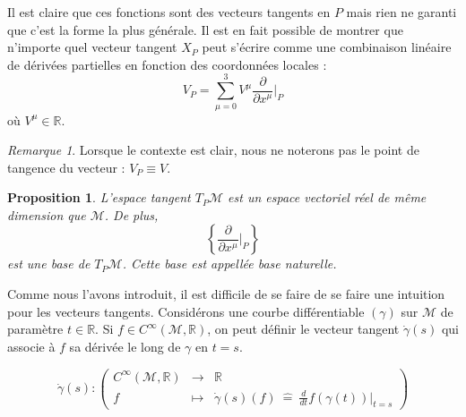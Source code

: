 \documentclass[a4paper,11pt]{report}
\theoremstyle{definition}
\theoremstyle{plain}
\newtheorem{prop}[thm]{Proposition}
\theoremstyle{definition}
\theoremstyle{remark}
\newtheorem{rmk}{Remarque}[chapter]
\newcommand{\M}{\mathscr{M}}
\newcommand{\p}{\partial}
\begin{document}
                Il est claire que ces fonctions sont des vecteurs tangents en $P$ mais rien ne garanti que c'est la forme la plus générale. Il est en fait possible de montrer que n'importe quel vecteur tangent $X_P$ peut s'écrire comme une combinaison linéaire de dérivées partielles en fonction des coordonnées locales :
                \begin{equation}
                    V_P = \sum_{\mu=0}^3 V^\mu \frac{\p}{\p x^\mu}\bigg|_P
                \end{equation}
                où $V^\mu\in\mathbb{R}$.
                
                \begin{rmk}
                    Lorsque le contexte est clair, nous ne noterons pas le point de tangence du vecteur : $V_P\equiv V$.
                \end{rmk}
                
                \begin{prop}
                    L'espace tangent $T_P\M$ est un espace vectoriel réel de même dimension que $\M$. De plus,
                    \begin{equation}
                        \left\{ \frac{\p}{\p x^\mu}\bigg|_P \right\}
                    \end{equation}
                    est une base de $T_P\M$. Cette base est appellée \textit{base naturelle}.
                \end{prop}
                
                Comme nous l'avons introduit, il est difficile de se faire de se faire une intuition pour les vecteurs tangents. Considérons une courbe différentiable $(\gamma)$ sur $\M$ de paramètre $t\in\mathbb{R}$. Si $f\in C^\infty(\M,\mathbb{R})$, on peut définir le vecteur tangent $\dot{\gamma}(s)$ qui associe à $f$ sa dérivée le long de $\gamma$ en $t=s$.
                
                \begin{equation}
                \dot{\gamma}(s):\left(
                \begin{array}{ccc}
                    C^\infty(\M,\mathbb{R}) & \longrightarrow & \mathbb{R} \\
                    f & \longmapsto &\dot{\gamma}(s)(f) ~\hat{=}~ \frac{d}{dt}f(\gamma(t))|_{t=s}
                \end{array}
                \right)
                \end{equation}
                
\end{document}
